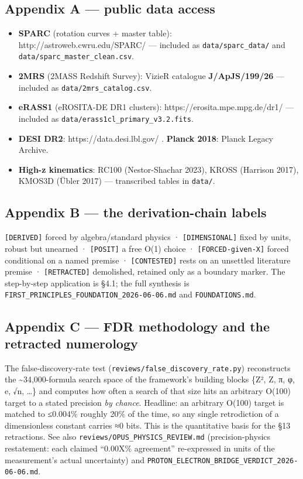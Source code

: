 \documentclass[
]{article}
\providecommand{\tightlist}{%
  \setlength{\itemsep}{0pt}\setlength{\parskip}{0pt}}
\begin{document}
\subsection{Appendix A --- public data
access}\label{appendix-a-public-data-access}

\begin{itemize}
\tightlist
\item
  \textbf{SPARC} (rotation curves + master table):
  http://astroweb.cwru.edu/SPARC/ --- included as
  \texttt{data/sparc\_data/} and \texttt{data/sparc\_master\_clean.csv}.
\item
  \textbf{2MRS} (2MASS Redshift Survey): VizieR catalogue
  \textbf{J/ApJS/199/26} --- included as
  \texttt{data/2mrs\_catalog.csv}.
\item
  \textbf{eRASS1} (eROSITA-DE DR1 clusters):
  https://erosita.mpe.mpg.de/dr1/ --- included as
  \texttt{data/erass1cl\_primary\_v3.2.fits}.
\item
  \textbf{DESI DR2}: https://data.desi.lbl.gov/ . \textbf{Planck 2018}:
  Planck Legacy Archive.
\item
  \textbf{High-z kinematics}: RC100 (Nestor-Shachar 2023), KROSS
  (Harrison 2017), KMOS3D (Übler 2017) --- transcribed tables in
  \texttt{data/}.
\end{itemize}

\subsection{Appendix B --- the derivation-chain
labels}\label{appendix-b-the-derivation-chain-labels}

\texttt{{[}DERIVED{]}} forced by algebra/standard physics ·
\texttt{{[}DIMENSIONAL{]}} fixed by units, robust but unearned ·
\texttt{{[}POSIT{]}} a free O(1) choice · \texttt{{[}FORCED-given-X{]}}
forced conditional on a named premise · \texttt{{[}CONTESTED{]}} rests
on an unsettled literature premise · \texttt{{[}RETRACTED{]}}
demolished, retained only as a boundary marker. The step-by-step
application is §4.1; the full synthesis is
\texttt{FIRST\_PRINCIPLES\_FOUNDATION\_2026-06-06.md} and
\texttt{FOUNDATIONS.md}.

\subsection{Appendix C --- FDR methodology and the retracted
numerology}\label{appendix-c-fdr-methodology-and-the-retracted-numerology}

The false-discovery-rate test
(\texttt{reviews/false\_discovery\_rate.py}) reconstructs the
\textasciitilde34,000-formula search space of the framework's building
blocks \{Z², Z, π, φ, e, √n, \ldots\} and computes how often a search of
that size hits an arbitrary O(100) target to a stated precision \emph{by
chance}. Headline: an arbitrary O(100) target is matched to ≤0.004\%
roughly 20\% of the time, so any single retrodiction of a dimensionless
constant carries ≈0 bits. This is the quantitative basis for the §13
retractions. See also \texttt{reviews/OPUS\_PHYSICS\_REVIEW.md}
(precision-physics restatement: each claimed ``0.00X\% agreement''
re-expressed in units of the measurement's actual uncertainty) and
\texttt{PROTON\_ELECTRON\_BRIDGE\_VERDICT\_2026-06-06.md}.
\end{document}
